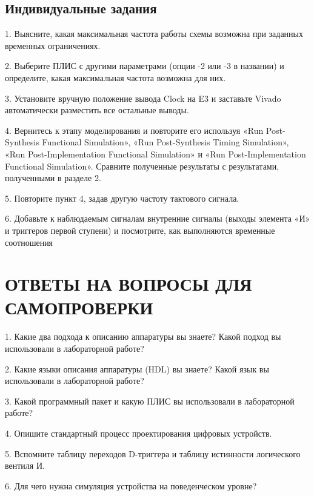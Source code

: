 \begin{sloppypar}
 
\subsection{Индивидуальные задания}%
1. Выясните, какая максимальная частота работы схемы возможна при заданных временных ограничениях.


2. Выберите ПЛИС с другими параметрами (опции -2 или -3 в названии) и определите, какая максимальная частота возможна для них.


3. Установите вручную положение вывода Clock на E3 и заставьте Vivado автоматически разместить все остальные выводы.


4. Вернитесь к этапу моделирования и повторите его используя «Run Post-Synthesis Functional Simulation», «Run Post-Synthesis Timing Simulation», «Run Post-Implementation Functional Simulation» и «Run Post-Implementation Functional Simulation». Сравните полученные результаты с результатами, полученными в разделе 2.


5. Повторите пункт 4, задав другую частоту тактового сигнала.



6. Добавьте к наблюдаемым сигналам внутренние сигналы (выходы элемента «И» и триггеров первой ступени) и посмотрите, как выполняются временные соотношения









\section*{ОТВЕТЫ НА ВОПРОСЫ ДЛЯ САМОПРОВЕРКИ}

1. Какие два подхода к описанию аппаратуры вы знаете? Какой подход
вы использовали в лабораторной работе?


2. Какие языки описания аппаратуры (HDL) вы знаете? Какой язык вы
использовали в лабораторной работе?


3. Какой программный пакет и какую ПЛИС вы использовали в лабораторной работе?


4. Опишите стандартный процесс проектирования цифровых устройств.


5. Вспомните таблицу переходов D-триггера и таблицу истинности логического вентиля И.


6. Для чего нужна симуляция устройства на поведенческом уровне?



\end{sloppypar}
